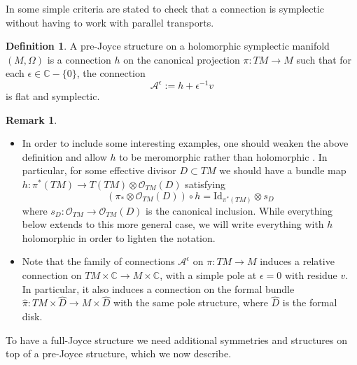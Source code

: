 \documentclass{article}
\theoremstyle{definition}
\newtheorem{definition}[theorem]{Definition}
\newtheorem{remark}[theorem]{Remark}
\numberwithin{equation}{section}
\begin{document}
In \cite[Lemma 2.3]{TwistorJoyce} some simple criteria are stated to check that a connection is symplectic without having to work with parallel transports. 

\begin{definition} A pre-Joyce structure on a holomorphic symplectic manifold $(M,\Omega)$ is a connection $h$ on the canonical projection $\pi:TM\to M$ such that for each $\epsilon\in \mathbb{C}-\{0\}$, the connection \begin{equation}\label{EC}
    \mathcal{A}^{\epsilon}:=h+\epsilon^{-1}v
\end{equation}
is flat and symplectic. 
\end{definition}
\begin{remark}\label{merrem}
    \begin{itemize}
        \item In order to include some interesting examples, one should weaken the above definition and allow $h$ to be meromorphic rather than holomorphic \cite[Remark 2.5]{TwistorJoyce}. In particular, for some effective divisor $D\subset TM$ we should have a bundle map $h:\pi^*(TM)\to T(TM)\otimes \mathcal{O}_{TM}(D)$ satisfying 
        \begin{equation*}
            (\pi_*\otimes \mathcal{O}_{TM}(D))\circ h=\text{Id}_{\pi^*(TM)}\otimes s_D
        \end{equation*}
        where $s_D:\mathcal{O}_{TM}\to \mathcal{O}_{TM}(D)$ is the canonical inclusion. While everything below extends to this more general case, we will write everything with $h$ holomorphic in order to lighten the notation. 
        \item Note that the family of connections $\mathcal{A}^{\epsilon}$ on $\pi:TM\to M$ induces a relative connection on $TM\times \mathbb{C}\to M\times \mathbb{C}$, with a simple pole at $\epsilon=0$ with residue $v$. In particular, it also induces a connection on the formal bundle $\hat{\pi}:TM\times \widehat{D}\to M\times \widehat{D}$ with the same pole structure, where $\widehat{D}$ is the formal disk. \\
    \end{itemize}
\end{remark}


To have a full-Joyce structure we need additional symmetries and structures on top of a pre-Joyce structure, which we now describe.
\end{document}
